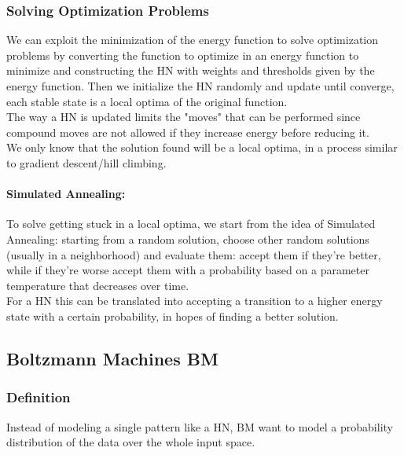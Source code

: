 \subsubsection{Solving Optimization Problems}
We can exploit the minimization of the energy function to solve optimization problems by converting the function to optimize in an energy function to minimize and constructing the HN with weights and thresholds given by the energy function. Then we initialize the HN randomly and update until converge, each stable state is a local optima of the original function.\\

The way a HN is updated limits the "moves" that can be performed since compound moves are not allowed if they increase energy before reducing it.\\
We only know that the solution found will be a local optima, in a process similar to gradient descent/hill climbing.\\

\paragraph{Simulated Annealing:} To solve getting stuck in a local optima, we start from the idea of Simulated Annealing: starting from a random solution, choose other random solutions (usually in a neighborhood) and evaluate them: accept them if they're better, while if they're worse accept them with a probability based on a parameter temperature that decreases over time.\\

For a HN this can be translated into accepting a transition to a higher energy state with a certain probability, in hopes of finding a better solution.\\

\subsection{Boltzmann Machines BM}

\subsubsection{Definition}
Instead of modeling a single pattern like a HN, BM want to model a probability distribution of the data over the whole input space.\\








